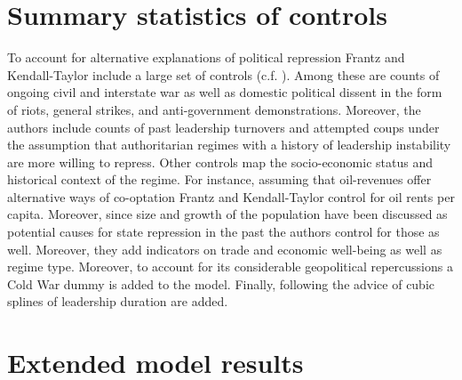 \documentclass[parskip=half]{scrartcl}\usepackage[]{graphicx}\usepackage[]{color}
\begin{document}
\appendix
\section{Summary statistics of controls}


To account for alternative explanations of political 
repression Frantz and Kendall-Taylor include a large set
of controls (c.f. \cite[338f.]{Frantz.2014}). Among these 
are counts of ongoing civil and interstate war as well as 
domestic political dissent in the form of riots, general 
strikes, and anti-government demonstrations. Moreover, the 
authors include counts of past leadership turnovers and 
attempted coups under the assumption that authoritarian 
regimes with a history of leadership instability are more 
willing to repress. Other controls map the socio-economic 
status and historical context of the regime. For instance, 
assuming that oil-revenues offer alternative ways of 
co-optation Frantz and Kendall-Taylor control for oil rents 
per capita. Moreover, since size and growth of the 
population have been discussed as potential causes for state
repression in the past the authors control for those as 
well. Moreover, they add indicators on trade and economic 
well-being as well as regime type. Moreover, to account for 
its considerable geopolitical repercussions a Cold War dummy
is added to the model. Finally, following the advice of 
\citet{Carter.2010} cubic splines of leadership duration are
added.

\newpage

\section{Extended model results}

\newpage

\printbibliography
\newpage
\end{document}
